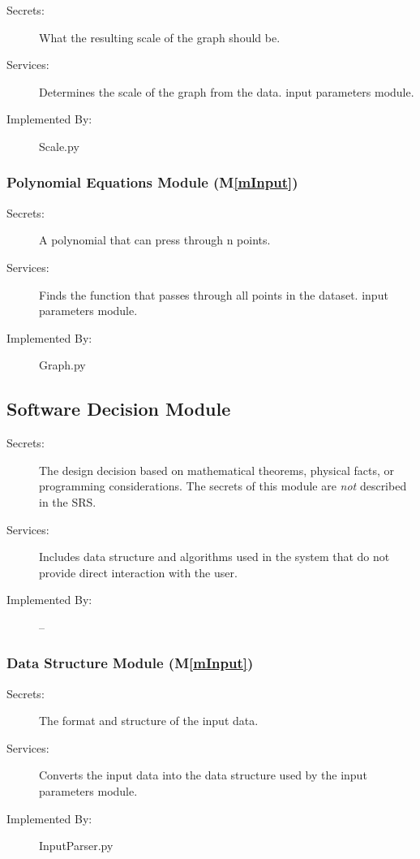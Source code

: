 \documentclass[12pt, titlepage]{article}
\newcommand{\mref}[1]{M\ref{#1}}
\begin{document}
\begin{description}
\item[Secrets:]What the resulting scale of the graph should be. 
\item[Services:]Determines the scale of the graph from the data.
  input parameters module.
\item[Implemented By:] Scale.py
\end{description}

\subsubsection{Polynomial Equations Module (\mref{mInput})}

\begin{description}
\item[Secrets:]A polynomial that can press through n points.  
\item[Services:]Finds the function that passes through all points in the dataset. 
  input parameters module.
\item[Implemented By:] Graph.py
\end{description}


\subsection{Software Decision Module}

\begin{description}
\item[Secrets:] The design decision based on mathematical theorems, physical
  facts, or programming considerations. The secrets of this module are
  \emph{not} described in the SRS.
\item[Services:] Includes data structure and algorithms used in the system that
  do not provide direct interaction with the user. 
\item[Implemented By:] --
\end{description}

\subsubsection{Data Structure Module (\mref{mInput})}
\begin{description}
\item[Secrets:]The format and structure of the input data.
\item[Services:]Converts the input data into the data structure used by the
  input parameters module.
\item[Implemented By:] InputParser.py
\end{description}
\end{document}
